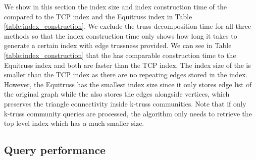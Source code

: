 \begin{table}
\begin{tabularx}{\linewidth}{c c *{6}{Y}}
			\bottomrule
		\end{tabularx}
\end{table}

We show in this section the index size and index construction time of the \twolevelindex{} compared to the TCP index and the Equitruss index in 
Table \ref{table:index_construction}. 
We exclude the truss decomposition time for all three methods so that the index construction time only shows how long it takes to generate a certain index with edge trussness provided. 
We can see in Table \ref{table:index_construction} that the \twolevelindex{} has comparable construction time to the Equitruss index and both are faster than the TCP index. The index size of the \twolevelindex{} is smaller than the TCP index as there are no repeating edges stored in the index. However, the Equitruss has the smallest index size since it only stores edge list of the original graph while the \twolevelindex{} also stores the edges alongside vertices, which preserves the triangle connectivity inside k-truss communities. Note that if only \toplevelprob{} k-truss community queries are processed, the algorithm only needs to retrieve the top level index which has a much smaller size. %

\subsection{Query performance}
\label{eval_query_time}

